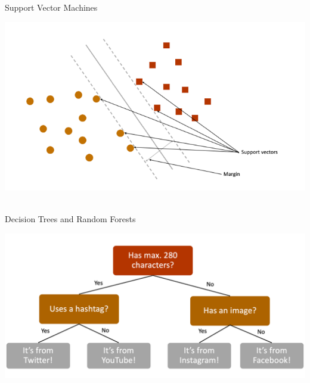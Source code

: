 \documentclass[compress]{beamer}
\begin{document}
\begin{frame}{Support Vector Machines}
	
\begin{center}
	\includegraphics[width=\linewidth,height=\textheight,keepaspectratio]{../pictures/SVM.png} \\\
\end{center}
\end{frame}


\begin{frame}{Decision Trees and Random Forests}
	
\begin{center}
	\includegraphics[width=\linewidth,height=\textheight,keepaspectratio]{../pictures/decisiontree.png} \\\
\end{center}
\end{frame}
\end{document}
